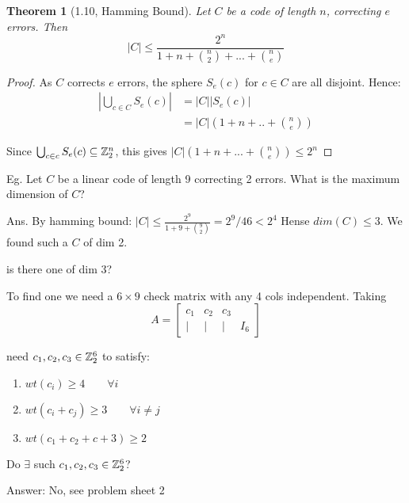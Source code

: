 \documentclass[]{amsart}
\newtheorem{thm}{Theorem}[section]
\theoremstyle{definition}
\theoremstyle{remark}
\numberwithin{equation}{section}
\begin{document}
\begin{thm}[1.10, Hamming Bound]
	Let $C$ be a code of length $n$, correcting $e$ errors. \newline
	Then \[ |C| \leq \frac{2^n}{1 + n + {n \choose 2} + ... + {n \choose e}}\]
\end{thm}

\begin{proof}
	As $C$ corrects $e$ errors, the sphere $S_e(c)$ for $c \in C$ are all disjoint. Hence: \newline
	\begin{align*}
		| \bigcup_{c\in C} S_e(c)| &= |C| | S_e(c)| \\
									&= |C| (1 + n + .. + {n \choose e}) 
	\end{align*}

	Since $\bigcup_{c \in c} S_e(c) \subseteq \mathbb{Z}_2^n$, this gives \newline
	$|C| (1 + n + ... + {n \choose e}) \leq 2^n$
\end{proof}

Eg. Let $C$ be a linear code of length 9 correcting 2 errors. What is the maximum dimension of $C$?

Ans. By hamming bound: \newline
	$|C| \leq \frac{2^9}{1+9+{9 \choose 2}}= 2^9/46 < 2^4$
	Hense $dim(C) \leq 3$.
	We found such a $C$ of dim 2.

	is there one of dim 3?

	To find one we need a $6 \times 9$ check matrix with any 4 cols independent. \newline
	Taking \[
		A = \begin{bmatrix}
			c_1 & c_2 & c_3 \\
			| & | & | & I_6

		\end{bmatrix}
	\]

	need $c_1, c_2, c_3 \in \mathbb{Z}_2^6$ to satisfy: \newline

	\begin{enumerate}
		\item $wt(c_i)\geq 4 \qquad \forall i$
		\item $wt(c_i + c_j) \geq 3 \qquad \forall i\neq j$
		\item $wt(c_1 + c_2 + c+3) \geq 2$
	\end{enumerate}

	Do $\exists$ such $c_1, c_2, c_3 \in \mathbb{Z}_2^6$?

	Answer: No, see problem sheet 2
\end{document}
